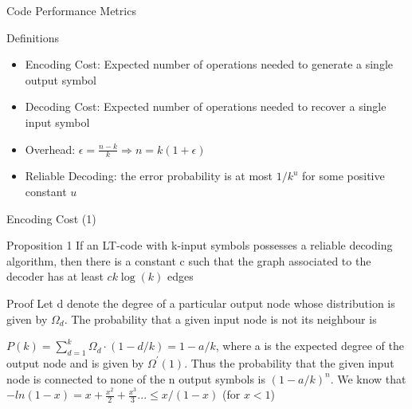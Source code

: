 \documentclass[handout,11pt]{beamer}
\begin{document}
\begin{frame}{Code Performance Metrics}
\begin{block}{Definitions}
\begin{itemize}

\item Encoding Cost: Expected number of operations needed to generate a single output symbol
\pause

\item Decoding Cost: Expected number of operations needed to recover a single input symbol
\pause

\item Overhead: $\epsilon =\frac{n-k}{k} \Rightarrow n=k(1+\epsilon)$ 
\pause

\item Reliable Decoding: the error probability is at most $1/k^u$ for some positive constant $u$

\end{itemize}
\end{block}
\end{frame}


\begin{frame}{Encoding Cost (1)}
\begin{block}{Proposition 1}
If an LT-code with k-input symbols possesses a reliable decoding algorithm, then there is a constant c such that the graph associated to the decoder has at least $ck\log\left (k \right)$ edges
\end{block}
\pause

\begin{block}{Proof}
Let d denote the degree of a particular output node whose distribution is given by $\Omega_d$.
\pause
The probability that a given input node is not its neighbour is

$P\left (k \right) =\sum_{d=1}^{k}\Omega_d \cdot \left (1 - d/k \right)=1-a/k$, 
where a is the expected degree of the output node and is given by $\Omega^{'}\left(1 \right)$. 
\pause
Thus the probability that the given input node is connected to none of the n output symbols is $(1-a/k)^{n}$.
\pause
We know that $-ln\left (1-x \right)= x + \frac{x^2}{2} + \frac{x^3}{3}...\le x/(1-x)$ (for $x < 1$)

\end{block}
\end{frame}
\end{document}
